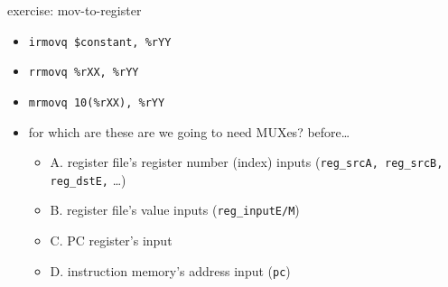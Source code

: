 \begin{frame}[fragile,label=MovRegIntro]{exercise: mov-to-register}
    \begin{itemize}
        \item \lstinline|irmovq $constant, %rYY|
        \item \lstinline|rrmovq %rXX, %rYY|
        \item \lstinline|mrmovq 10(%rXX), %rYY|
        \vspace{.5cm}
        \item for which are these are we going to need MUXes? before\ldots
            \begin{itemize}
            \item A. register file's register number (index) inputs ({\small \texttt{reg\_srcA, reg\_srcB, reg\_dstE,} \ldots})
            \item B. register file's value inputs ({\small \texttt{reg\_inputE/M}})
            \item C. PC register's input
            \item D. instruction memory's address input ({\small \texttt{pc}})
            \end{itemize}
    \end{itemize}
\end{frame}


